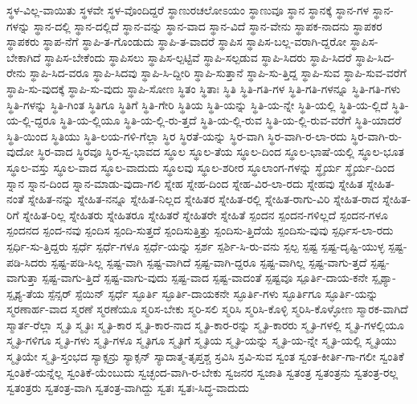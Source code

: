 {ಸ್ಥಳ-ವಿಲ್ಲ-ವಾಯಿತು
ಸ್ಥಳವೇ
ಸ್ಥಳ-ವೊಂದಿದ್ದರೆ
ಸ್ಥಾಣುರಚಲೋಽಯಂ
ಸ್ಥಾಣುವೂ
ಸ್ಥಾನ
ಸ್ಥಾನಕ್ಕೆ
ಸ್ಥಾನ-ಗಳ
ಸ್ಥಾನ-ಗಳನ್ನು
ಸ್ಥಾನ-ದಲ್ಲಿ
ಸ್ಥಾನ-ದಲ್ಲಿದೆ
ಸ್ಥಾನ-ವನ್ನು
ಸ್ಥಾನ-ವಾದ
ಸ್ಥಾನ-ವಿದೆ
ಸ್ಥಾನ-ವೇನು
ಸ್ಥಾಪಕ-ನಾದನು
ಸ್ಥಾಪಕರ
ಸ್ಥಾಪಕರು
ಸ್ಥಾಪ-ನೆಗೆ
ಸ್ಥಾಪಿ-ತ-ಗೊಂಡುದು
ಸ್ಥಾಪಿ-ತ-ವಾದರೆ
ಸ್ಥಾಪಿಸ
ಸ್ಥಾಪಿಸ-ಬಲ್ಲ-ವರಾಗಿ-ದ್ದರೋ
ಸ್ಥಾಪಿಸ-ಬೇಕಾಗಿದೆ
ಸ್ಥಾಪಿಸ-ಬೇಕೆಂದು
ಸ್ಥಾಪಿಸಲು
ಸ್ಥಾಪಿಸ-ಲ್ಪಟ್ಟಿವೆ
ಸ್ಥಾಪಿ-ಸಲ್ಪಡುವ
ಸ್ಥಾಪಿ-ಸಿದರು
ಸ್ಥಾಪಿ-ಸಿದರೆ
ಸ್ಥಾಪಿ-ಸಿದ-ರೇನು
ಸ್ಥಾಪಿ-ಸಿದ-ವರೂ
ಸ್ಥಾಪಿ-ಸಿದವು
ಸ್ಥಾಪಿ-ಸಿ-ದ್ದೀರಿ
ಸ್ಥಾಪಿ-ಸುತ್ತಾನೆ
ಸ್ಥಾಪಿ-ಸು-ತ್ತಿದ್ದ
ಸ್ಥಾಪಿ-ಸುವ
ಸ್ಥಾಪಿ-ಸುವ-ವರೆಗೆ
ಸ್ಥಾಪಿ-ಸು-ವುದಕ್ಕೆ
ಸ್ಥಾಪಿ-ಸು-ವುದು
ಸ್ಥಾಪಿ-ಸೋಣ
ಸ್ಥಿತಂ
ಸ್ಥಿತಾಃ
ಸ್ಥಿತಿ
ಸ್ಥಿತಿ-ಗತಿ-ಗಳ
ಸ್ಥಿತಿ-ಗತಿ-ಗಳನ್ನೂ
ಸ್ಥಿತಿ-ಗತಿ-ಗಳು
ಸ್ಥಿತಿ-ಗಳನ್ನು
ಸ್ಥಿತಿ-ಗಿಂತ
ಸ್ಥಿತಿಗೂ
ಸ್ಥಿತಿಗೆ
ಸ್ಥಿತಿ-ಗೇರಿ
ಸ್ಥಿತಿಯ
ಸ್ಥಿತಿ-ಯನ್ನು
ಸ್ಥಿತಿ-ಯ-ನ್ನೇ
ಸ್ಥಿತಿ-ಯಲ್ಲಿ
ಸ್ಥಿತಿ-ಯ-ಲ್ಲಿದೆ
ಸ್ಥಿತಿ-ಯ-ಲ್ಲಿ-ದ್ದರೂ
ಸ್ಥಿತಿ-ಯ-ಲ್ಲಿಯೂ
ಸ್ಥಿತಿ-ಯ-ಲ್ಲಿ-ರು-ತ್ತದೆ
ಸ್ಥಿತಿ-ಯ-ಲ್ಲಿ-ರುವ
ಸ್ಥಿತಿ-ಯ-ಲ್ಲಿ-ರುವ-ವರೆಗೆ
ಸ್ಥಿತಿ-ಯಾದರೆ
ಸ್ಥಿತಿ-ಯಿಂದ
ಸ್ಥಿತಿಯು
ಸ್ಥಿತಿ-ಲಯ-ಗಳಿ-ಗೆಲ್ಲಾ
ಸ್ಥಿರ
ಸ್ಥಿರತೆ-ಯನ್ನು
ಸ್ಥಿರ-ವಾಗಿ
ಸ್ಥಿರ-ವಾಗಿ-ರ-ಲಾ-ರದು
ಸ್ಥಿರ-ವಾಗಿ-ರು-ವುದೋ
ಸ್ಥಿರ-ವಾದ
ಸ್ಥಿರವೂ
ಸ್ಥಿರ-ಸ್ವ-ಭಾವದ
ಸ್ಥೂಲ
ಸ್ಥೂಲ-ತೆಯ
ಸ್ಥೂಲ-ದಿಂದ
ಸ್ಥೂಲ-ಭಾಷೆ-ಯಲ್ಲಿ
ಸ್ಥೂಲ-ಭೂತ
ಸ್ಥೂಲ-ವಸ್ತು
ಸ್ಥೂಲ-ವಾದ
ಸ್ಥೂಲ-ವಾದುದು
ಸ್ಥೂಲವು
ಸ್ಥೂಲ-ಶರೀರ
ಸ್ಥೂಲಾಂಗ-ಗಳನ್ನು
ಸ್ಥೈರ್ಯ
ಸ್ಥೈರ್ಯ-ದಿಂದ
ಸ್ನಾನ
ಸ್ನಾನ-ದಿಂದ
ಸ್ನಾನ-ಮಾಡು-ವುದಾ-ಗಲಿ
ಸ್ನೇಹ
ಸ್ನೇಹ-ದಿಂದ
ಸ್ನೇಹ-ವಿರ-ಲಾ-ರದು
ಸ್ನೇಹವು
ಸ್ನೇಹಿತ
ಸ್ನೇಹಿತ-ನಂತೆ
ಸ್ನೇಹಿತ-ನನ್ನು
ಸ್ನೇಹಿತ-ನನ್ನೂ
ಸ್ನೇಹಿತ-ನಿಲ್ಲದ
ಸ್ನೇಹಿತರ
ಸ್ನೇಹಿತ-ರಲ್ಲಿ
ಸ್ನೇಹಿತ-ರಾಗು-ವಿರಿ
ಸ್ನೇಹಿತ-ರಾದ
ಸ್ನೇಹಿತ-ರಿಗೆ
ಸ್ನೇಹಿತ-ರಿಲ್ಲ
ಸ್ನೇಹಿತರು
ಸ್ನೇಹಿತರೂ
ಸ್ನೇಹಿತರೆ
ಸ್ನೇಹಿತರೇ
ಸ್ನೇಹಿತೆ
ಸ್ಪಂದನ
ಸ್ಪಂದನ-ಗಳಿಲ್ಲದೆ
ಸ್ಪಂದನ-ಗಳೂ
ಸ್ಪಂದನದ
ಸ್ಪಂದ-ನವು
ಸ್ಪಂದಿಸ
ಸ್ಪಂದಿ-ಸುತ್ತದೆ
ಸ್ಪಂದಿಸುತ್ತಿತ್ತು
ಸ್ಪಂದಿಸು-ತ್ತಿದೆಯೆ
ಸ್ಪಂದಿಸು-ವುವು
ಸ್ಪರ್ಧಿಸ-ಲಾ-ರದು
ಸ್ಪರ್ಧಿ-ಸು-ತ್ತಿದ್ದರು
ಸ್ಪರ್ಧೆ
ಸ್ಪರ್ಧೆ-ಗಳೂ
ಸ್ಪರ್ಧೆ-ಯನ್ನು
ಸ್ಪರ್ಶ
ಸ್ಪರ್ಶಿ-ಸಿ-ರು-ವನು
ಸ್ಪಲ್ಪ
ಸ್ಪಷ್ಟ
ಸ್ಪಷ್ಟ-ದೃಷ್ಟಿ-ಯುಳ್ಳ
ಸ್ಪಷ್ಟ-ಪಡಿ-ಸಿದರು
ಸ್ಪಷ್ಟ-ಪಡಿ-ಸಿಲ್ಲ
ಸ್ಪಷ್ಟ-ವಾಗಿ
ಸ್ಪಷ್ಟ-ವಾಗಿದೆ
ಸ್ಪಷ್ಟ-ವಾಗಿ-ದ್ದರೂ
ಸ್ಪಷ್ಟ-ವಾಗಿಲ್ಲ
ಸ್ಪಷ್ಟ-ವಾಗು-ತ್ತದೆ
ಸ್ಪಷ್ಟ-ವಾಗುತ್ತಾ
ಸ್ಪಷ್ಟ-ವಾಗು-ತ್ತಿದೆ
ಸ್ಪಷ್ಟ-ವಾಗು-ವುದು
ಸ್ಪಷ್ಟ-ವಾದ
ಸ್ಪಷ್ಟ-ವಾದಂತೆ
ಸ್ಪಷ್ಟವೂ
ಸ್ಪೂರ್ತಿ-ದಾಯ-ಕನೇ
ಸ್ಪೃಶ್ಯಾ-ಸ್ಪೃಶ್ಯ-ತೆಯ
ಸ್ಪೆನ್ಸರ್
ಸ್ಪೆಯಿನ್
ಸ್ಫರ್ಧೆ
ಸ್ಫೂರ್ತಿ
ಸ್ಫೂರ್ತಿ-ದಾಯಕನೇ
ಸ್ಫೂರ್ತಿ-ಗಳು
ಸ್ಫೂರ್ತಿಗೂ
ಸ್ಫೂರ್ತಿ-ಯನ್ನು
ಸ್ಮರಣಾರ್ಹ-ವಾದ
ಸ್ಮರಣೆ
ಸ್ಮರಣೆಯೂ
ಸ್ಮರಿಸ-ಬೇಕು
ಸ್ಮರಿ-ಸಲಿ
ಸ್ಮರಿಸಿ
ಸ್ಮರಿಸಿ-ಕೊಳ್ಳಿ
ಸ್ಮರಿಸಿ-ಕೊಳ್ಳೋಣ
ಸ್ಮಾರಕ-ವಾಗಿದೆ
ಸ್ಮಾರ್ತ-ರೆಲ್ಲಾ
ಸ್ಮೃತಿ
ಸ್ಮೃತಿಃ
ಸ್ಮೃತಿ-ಕಾರ
ಸ್ಮೃತಿ-ಕಾರ-ನಾದ
ಸ್ಮೃತಿ-ಕಾರ-ರನ್ನು
ಸ್ಮೃತಿ-ಕಾರರು
ಸ್ಮೃತಿ-ಗಳಲ್ಲಿ
ಸ್ಮೃತಿ-ಗಳಲ್ಲಿಯೂ
ಸ್ಮೃತಿ-ಗಳಿಗೂ
ಸ್ಮೃತಿ-ಗಳು
ಸ್ಮೃತಿ-ಗಳೂ
ಸ್ಮೃತಿಗೂ
ಸ್ಮೃತಿಗೆ
ಸ್ಮೃತಿಯ
ಸ್ಮೃತಿ-ಯನ್ನು
ಸ್ಮೃತಿ-ಯ-ನ್ನೇ
ಸ್ಮೃತಿ-ಯಲ್ಲಿ
ಸ್ಮೃತಿಯು
ಸ್ಮೃತಿಯೇ
ಸ್ಮೃತಿ-ಸ್ತಂಭದ
ಸ್ಯಾಕ್ಸನ್ರು
ಸ್ಯಾಕ್ಸನ್
ಸ್ಯಾದಾತ್ಮ-ತೃಪ್ತಶ್ಚ
ಸ್ರವಿಸಿ
ಸ್ರವಿ-ಸುವ
ಸ್ವಂತ
ಸ್ವಂತ-ಕೀರ್ತಿ-ಗಾ-ಗಲೀ
ಸ್ವಂತಿಕೆ
ಸ್ವಂತಿಕೆ-ಯನ್ನೆಲ್ಲ
ಸ್ವಂತಿಕೆ-ಯೆಂಬುದು
ಸ್ವಚ್ಛಂದ-ವಾಗಿ-ರ-ಬೇಕು
ಸ್ವಜನರ
ಸ್ವಜಾತಿ
ಸ್ವತಂತ್ರ
ಸ್ವತಂತ್ರನು
ಸ್ವತಂತ್ರ-ರಲ್ಲ
ಸ್ವತಂತ್ರರು
ಸ್ವತಂತ್ರ-ವಾಗಿ
ಸ್ವತಂತ್ರ-ವಾಗಿದ್ದು
ಸ್ವತಃ
ಸ್ವತಃ-ಸಿದ್ಧ-ವಾದುದು
}
